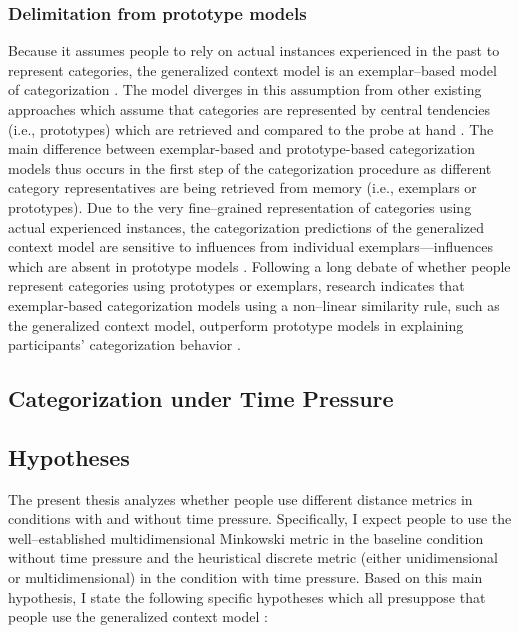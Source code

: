 \documentclass[a4paper,man,natbib]{apa6}
\begin{document}
\subsubsection{Delimitation from prototype models}
Because it assumes people to rely on actual instances experienced in the past to represent categories, the generalized context model is an exemplar--based model of categorization \citep{medin1978context, nosofsky1986attention}. The model diverges in this assumption from other existing approaches which assume that categories are represented by central tendencies (i.e., prototypes) which are retrieved and compared to the probe at hand \citep{nosofsky1987attention}. The main difference between exemplar-based and prototype-based categorization models thus occurs in the first step of the categorization procedure as different category representatives are being retrieved from memory (i.e., exemplars or prototypes). Due to the very fine--grained representation of categories using actual experienced instances, the categorization predictions of the generalized context model are sensitive to influences from individual exemplars---influences which are absent in prototype models \citep{nosofsky2011generalized, nosofsky1992exemplars, medin1978context}. Following a long debate of whether people represent categories using prototypes or exemplars, research indicates that exemplar-based categorization models using a non--linear similarity rule, such as the generalized context model, outperform prototype models in explaining participants' categorization behavior \citep{nosofsky2002exemplar, nosofsky1992exemplars}.

\subsection{Categorization under Time Pressure}

\subsection{Hypotheses}
The present thesis analyzes whether people use different distance metrics in conditions with and without time pressure. Specifically, I expect people to use the well--established multidimensional Minkowski metric in the baseline condition without time pressure and the heuristical discrete metric (either unidimensional or multidimensional) in the condition with time pressure. Based on this main hypothesis, I state the following specific hypotheses which all presuppose that people use the generalized context model \citep{nosofsky1989further}: 
\end{document}
